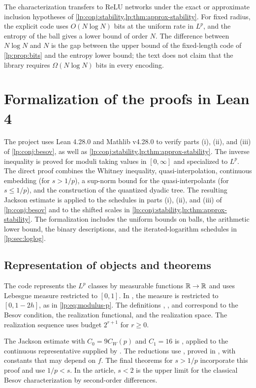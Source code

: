 \documentclass[11pt,a4paper]{article}
\begin{document}
The characterization transfers to ReLU networks under the exact or approximate inclusion hypotheses of \cref{lp:conj:stability,lp:thm:approx-stability}. For fixed radius, the explicit code uses $O(N\log N)$ bits at the uniform rate in $L^p$, and the entropy of the ball gives a lower bound of order $N$. The difference between $N\log N$ and $N$ is the gap between the upper bound of the fixed-length code of \cref{lp:prop:bits} and the entropy lower bound; the text does not claim that the library requires $\Omega(N\log N)$ bits in every encoding.

\articleappendix
\section{Formalization of the proofs in Lean 4}
\label{lp:sec:lean}

The  project uses Lean 4.28.0 and Mathlib v4.28.0 \citep{lp-mathlib,lp-lean4} to verify parts (i), (ii), and (iii) of \cref{lp:conj:besov}, as well as \cref{lp:conj:stability,lp:thm:approx-stability}. The inverse inequality is proved for moduli taking values in $[0,\infty]$ and specialized to $L^p$. The direct proof combines the Whitney inequality, quasi-interpolation, continuous embedding (for $s>1/p$), a sup-norm bound for the quasi-interpolants (for $s\le1/p$), and the construction of the quantized dyadic tree. The resulting Jackson estimate is applied to the schedules in parts (i), (ii), and (iii) of \cref{lp:conj:besov} and to the shifted scales in \cref{lp:conj:stability,lp:thm:approx-stability}. The formalization includes the uniform bounds on balls, the arithmetic lower bound, the binary descriptions, and the iterated-logarithm schedules in \cref{lp:sec:loglog}.

\subsection{Representation of objects and theorems}
\label{lp:sec:fidelity}

The code represents the $L^p$ classes by measurable functions $\mathbb R\to\mathbb R$ and uses Lebesgue measure restricted to $[0,1]$. In , the measure is restricted to $[0,1-2h]$, as in \eqref{lp:eq:modulus-p}. The definitions , , and  correspond to the Besov condition, the realization functional, and the realization space. The realization sequence uses budget $2^{r+1}$ for $r\ge0$.

The Jackson estimate with $C_0=9C_W(p)$ and $C_1=16$ is , applied to the continuous representative supplied by . The reductions use , proved in , with constants that may depend on $f$. The final theorems for $s>1/p$ incorporate this proof and use $1/p<s$. In the article, $s<2$ is the upper limit for the classical Besov characterization by second-order differences.
\end{document}
